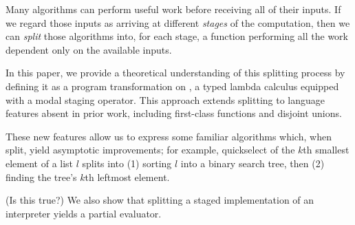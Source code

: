 Many algorithms can perform useful work before receiving all of their inputs.
If we regard those inputs as arriving at different \emph{stages} of the
computation, then we can \emph{split} those algorithms into, for each stage, a
function performing all the work dependent only on the available inputs.

In this paper, we provide a theoretical understanding of this splitting process
by defining it as a program transformation on \lang, a typed lambda calculus
equipped with a modal staging operator. This approach extends splitting to
language features absent in prior work, including first-class functions and
disjoint unions.

These new features allow us to express some familiar algorithms which, when
split, yield asymptotic improvements; for example, quickselect of the $k$th
smallest element of a list $l$ splits into (1) sorting $l$ into a binary search
tree, then (2) finding the tree's $k$th leftmost element.

\TODO (Is this true?)
We also show that splitting a staged implementation of an interpreter yields a
partial evaluator.





